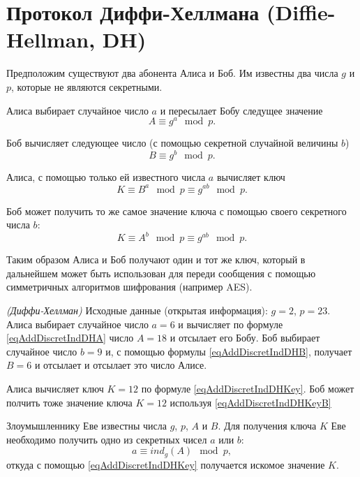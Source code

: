 \section{Протокол Диффи-Хеллмана (Diffie-Hellman, DH)}
Предположим существуют два абонента Алиса и Боб. Им известны два числа
$g$ и $p$, которые не являются секретными.

Алиса выбирает случайное число $a$ и пересылает Бобу следущее значение
\begin{equation}
A \equiv g^a \mod{p}.
\label{eqAddDiscretIndDHA}
\end{equation}

Боб вычисляет следующее число (с помощью секретной случайной величины
$b$)
\begin{equation}
B \equiv g^b \mod{p}.
\label{eqAddDiscretIndDHB}
\end{equation}

Алиса, с помощью только ей известного числа $a$ вычисляет ключ
\begin{equation}
K \equiv B^a\mod{p} \equiv g^{ab} \mod{p}.
\label{eqAddDiscretIndDHKey}
\end{equation}

Боб может получить то же самое значение ключа с помощью своего
секретного числа $b$:
\begin{equation}
K \equiv A^b\mod{p} \equiv g^{ab} \mod{p}.
\label{eqAddDiscretIndDHKeyB}
\end{equation}

Таким образом Алиса и Боб получают один и тот же ключ, который в
дальнейшем может быть использован для переди сообщения с помощью
симметричных алгоритмов шифрования (например AES).

\begin{example}
\emph{(Диффи-Хеллман)}
Исходные данные (открытая информация): $g = 2$, $p = 23$. Алиса
выбирает случайное число $a = 6$ и вычисляет по формуле
\eqref{eqAddDiscretIndDHA} число 
$A = 18$ и отсылает его Бобу.
Боб выбирает случайное число $b=9$ и, с помощью формулы 
\eqref{eqAddDiscretIndDHB}, получает
$B = 6$ и отсылает и отсылает это число Алисе.

Алиса вычисляет ключ 
$K = 12$ по формуле \eqref{eqAddDiscretIndDHKey}. Боб может полчить
тоже значение ключа 
$K = 12$ используя \eqref{eqAddDiscretIndDHKeyB}
\nonumber
\end{example}

Злоумышленнику Еве известны числа $g$, $p$, $A$ и $B$. Для получения
ключа $K$ Еве необходимо получить одно из секретных чисел $a$ или $b$:
\begin{equation}
a \equiv ind_g\left( A \right) \mod{p},
\nonumber
\end{equation}
откуда с помощью \eqref{eqAddDiscretIndDHKey} получается искомое
значение $K$.
